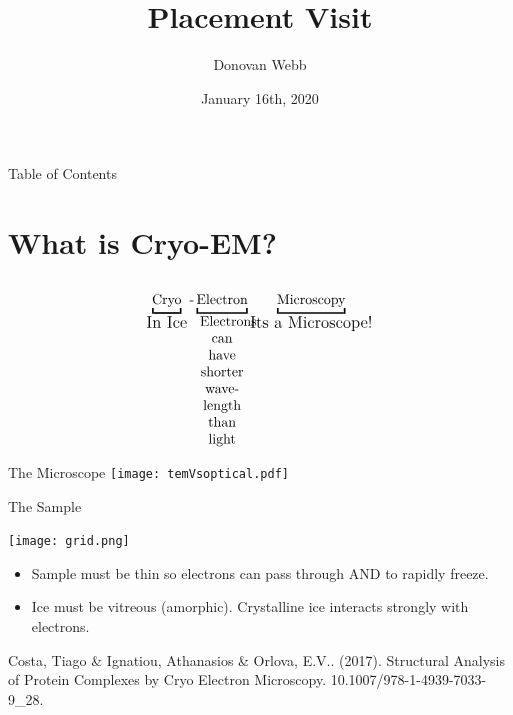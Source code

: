 \documentclass[t, 11pt]{beamer}
\date{January 16th, 2020}
\author{Donovan Webb}
\institute{University of Bath/eBIC}
\title{Placement Visit}
\begin{document}
\begin{frame}[plain]
  \maketitle
\end{frame}
\addtocounter{framenumber}{-1} %

\begin{frame}{Table of Contents}
  \tableofcontents[sectionstyle=show/show, hideallsubsections]
\end{frame}

\section{What is Cryo-EM?}
\subsection{}
\begin{frame}[blank]
  \centering\vspace{1em}\Huge \[\underbracket{\text{Cryo}}_{\text{\large In Ice}}\text{-}\underbracket{\vphantom{\text{y}}\text{Electron}}_{\text{\parbox{4em}{\centering\normalsize Electrons can have shorter wavelength than light}}} \underbracket{\text{Microscopy}}_{\text{\large Its a Microscope!}} \]
\end{frame}

\begin{frame}[blank]{The Microscope}
  \vspace{-0.5em}
  \texttt{[image: temVsoptical.pdf]}
\end{frame}

\begin{frame}[fragile]{The Sample}
  \begin{center}\texttt{[image: grid.png]}
    \end{center}

    \begin{itemize}
    \item Sample must be thin so electrons can pass through AND to rapidly freeze.
    \item Ice must be vitreous (amorphic). Crystalline ice interacts strongly with electrons.
    \end{itemize}

    \tiny Costa, Tiago \& Ignatiou, Athanasios \& Orlova, E.V.. (2017). Structural Analysis of Protein Complexes by Cryo Electron Microscopy. 10.1007/978-1-4939-7033-9\_28. 
\end{frame}
\end{document}
